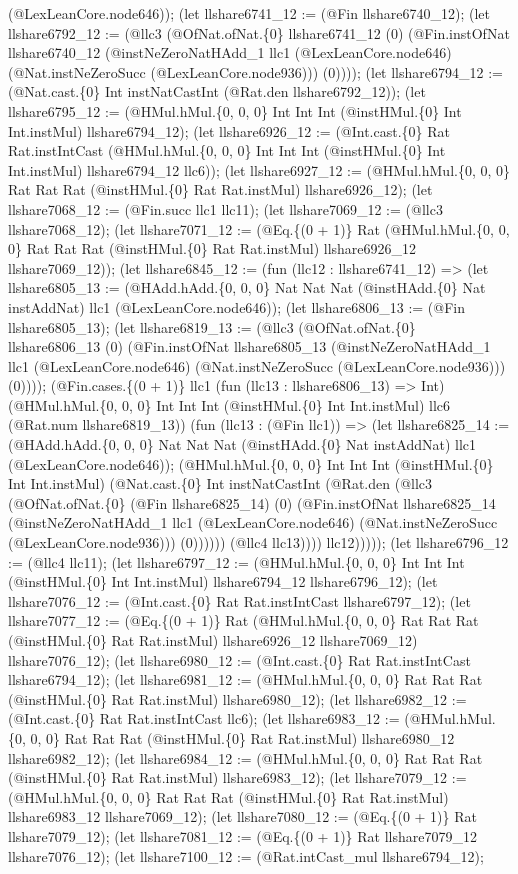 \documentclass[11pt]{article}
\begin{document}
(@LexLeanCore.node646)); (let llshare6741\_12 := (@Fin llshare6740\_12); (let llshare6792\_12 := (@llc3 (@OfNat.ofNat.\{0\} llshare6741\_12 (0) (@Fin.instOfNat llshare6740\_12 (@instNeZeroNatHAdd\_1 llc1 (@LexLeanCore.node646) (@Nat.instNeZeroSucc (@LexLeanCore.node936))) (0)))); (let llshare6794\_12 := (@Nat.cast.\{0\} Int instNatCastInt (@Rat.den llshare6792\_12)); (let llshare6795\_12 := (@HMul.hMul.\{0, 0, 0\} Int Int Int (@instHMul.\{0\} Int Int.instMul) llshare6794\_12); (let llshare6926\_12 := (@Int.cast.\{0\} Rat Rat.instIntCast (@HMul.hMul.\{0, 0, 0\} Int Int Int (@instHMul.\{0\} Int Int.instMul) llshare6794\_12 llc6)); (let llshare6927\_12 := (@HMul.hMul.\{0, 0, 0\} Rat Rat Rat (@instHMul.\{0\} Rat Rat.instMul) llshare6926\_12); (let llshare7068\_12 := (@Fin.succ llc1 llc11); (let llshare7069\_12 := (@llc3 llshare7068\_12); (let llshare7071\_12 := (@Eq.\{(0 + 1)\} Rat (@HMul.hMul.\{0, 0, 0\} Rat Rat Rat (@instHMul.\{0\} Rat Rat.instMul) llshare6926\_12 llshare7069\_12)); (let llshare6845\_12 := (fun (llc12 : llshare6741\_12) => (let llshare6805\_13 := (@HAdd.hAdd.\{0, 0, 0\} Nat Nat Nat (@instHAdd.\{0\} Nat instAddNat) llc1 (@LexLeanCore.node646)); (let llshare6806\_13 := (@Fin llshare6805\_13); (let llshare6819\_13 := (@llc3 (@OfNat.ofNat.\{0\} llshare6806\_13 (0) (@Fin.instOfNat llshare6805\_13 (@instNeZeroNatHAdd\_1 llc1 (@LexLeanCore.node646) (@Nat.instNeZeroSucc (@LexLeanCore.node936))) (0)))); (@Fin.cases.\{(0 + 1)\} llc1 (fun (llc13 : llshare6806\_13) => Int) (@HMul.hMul.\{0, 0, 0\} Int Int Int (@instHMul.\{0\} Int Int.instMul) llc6 (@Rat.num llshare6819\_13)) (fun (llc13 : (@Fin llc1)) => (let llshare6825\_14 := (@HAdd.hAdd.\{0, 0, 0\} Nat Nat Nat (@instHAdd.\{0\} Nat instAddNat) llc1 (@LexLeanCore.node646)); (@HMul.hMul.\{0, 0, 0\} Int Int Int (@instHMul.\{0\} Int Int.instMul) (@Nat.cast.\{0\} Int instNatCastInt (@Rat.den (@llc3 (@OfNat.ofNat.\{0\} (@Fin llshare6825\_14) (0) (@Fin.instOfNat llshare6825\_14 (@instNeZeroNatHAdd\_1 llc1 (@LexLeanCore.node646) (@Nat.instNeZeroSucc (@LexLeanCore.node936))) (0)))))) (@llc4 llc13)))) llc12))))); (let llshare6796\_12 := (@llc4 llc11); (let llshare6797\_12 := (@HMul.hMul.\{0, 0, 0\} Int Int Int (@instHMul.\{0\} Int Int.instMul) llshare6794\_12 llshare6796\_12); (let llshare7076\_12 := (@Int.cast.\{0\} Rat Rat.instIntCast llshare6797\_12); (let llshare7077\_12 := (@Eq.\{(0 + 1)\} Rat (@HMul.hMul.\{0, 0, 0\} Rat Rat Rat (@instHMul.\{0\} Rat Rat.instMul) llshare6926\_12 llshare7069\_12) llshare7076\_12); (let llshare6980\_12 := (@Int.cast.\{0\} Rat Rat.instIntCast llshare6794\_12); (let llshare6981\_12 := (@HMul.hMul.\{0, 0, 0\} Rat Rat Rat (@instHMul.\{0\} Rat Rat.instMul) llshare6980\_12); (let llshare6982\_12 := (@Int.cast.\{0\} Rat Rat.instIntCast llc6); (let llshare6983\_12 := (@HMul.hMul.\{0, 0, 0\} Rat Rat Rat (@instHMul.\{0\} Rat Rat.instMul) llshare6980\_12 llshare6982\_12); (let llshare6984\_12 := (@HMul.hMul.\{0, 0, 0\} Rat Rat Rat (@instHMul.\{0\} Rat Rat.instMul) llshare6983\_12); (let llshare7079\_12 := (@HMul.hMul.\{0, 0, 0\} Rat Rat Rat (@instHMul.\{0\} Rat Rat.instMul) llshare6983\_12 llshare7069\_12); (let llshare7080\_12 := (@Eq.\{(0 + 1)\} Rat llshare7079\_12); (let llshare7081\_12 := (@Eq.\{(0 + 1)\} Rat llshare7079\_12 llshare7076\_12); (let llshare7100\_12 := (@Rat.intCast\_mul llshare6794\_12); 
\end{document}
